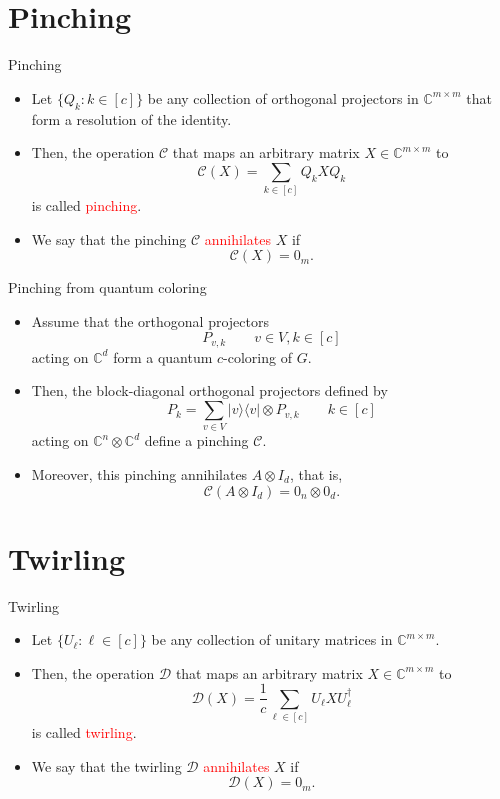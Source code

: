 \documentclass{beamer}
\newcommand{\C}{\mathbb{C}}
\newcommand{\cC}{\mathcal{C}}
\newcommand{\cD}{\mathcal{D}}
\renewcommand{\>}{\rangle}
\newcommand{\<}{\langle}
\begin{document}
%
%
%

\section{Pinching}

\begin{frame}{Pinching}
\begin{itemize}
\item Let $\{Q_k : k\in [c]\}$ be any collection of orthogonal projectors in $\C^{m\times m}$ that form a resolution of the identity.

\item Then, the operation $\cC$ that maps an arbitrary matrix $X\in\C^{m\times m}$ to
\[
\cC(X) = \sum_{k\in [c]} Q_k X Q_k
\]
is called \textcolor{red}{pinching}.

\item We say that the pinching $\cC$ \textcolor{red}{annihilates} $X$ if
\[
\cC(X) = 0_m.
\]
\end{itemize}
\end{frame}

%

\begin{frame}{Pinching from quantum coloring}

\begin{itemize}
\item Assume that the orthogonal projectors 
\[
P_{v,k} \quad \quad v \in V, k \in [c] 
\]
acting on $\C^d$ form a quantum $c$-coloring of $G$.

\item Then, the block-diagonal orthogonal projectors defined by
\[
P_k = \sum_{v\in V} |v\>\<v| \otimes P_{v,k} \quad \quad k \in [c]
\]
acting on $\C^n\otimes \C^d$ define a pinching $\cC$.

\item Moreover, this pinching annihilates $A\otimes I_d$, that is, 
\[
\cC(A\otimes I_d) = 0_n \otimes 0_d.
\]
\end{itemize}

\end{frame}

%

\section{Twirling}

\begin{frame}{Twirling}
\begin{itemize}
\item Let $\{U_\ell : \ell\in [c]\}$ be any collection of unitary matrices in $\C^{m\times m}$.

\item Then, the operation $\cD$ that maps an arbitrary matrix $X\in\C^{m\times m}$ to
\[
\cD(X) = \frac{1}{c} \sum_{\ell\in [c]} U_\ell X U_\ell^\dagger
\]
is called \textcolor{red}{twirling}.

\item We say that the twirling $\cD$ \textcolor{red}{annihilates} $X$ if
\[
\cD(X) = 0_m.
\]
\end{itemize}

\end{frame}
\end{document}
